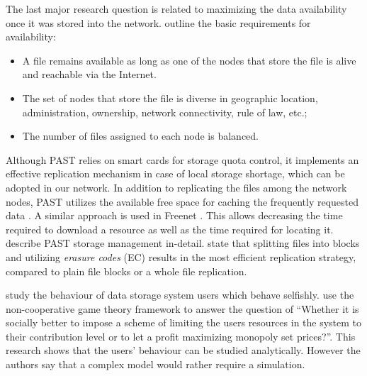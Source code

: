 The last major research question is related to maximizing the data
availability once it was stored into the network.
\citet{past} outline the basic requirements for availability:

\begin{itemize}
\item A file remains available as long as one of the nodes that
      store the file is alive and reachable via the Internet.
\item The set of nodes that store the file is diverse in geographic
      location, administration, ownership, network connectivity, rule
      of law, etc.;
\item The number of files assigned to each node is balanced.
\end{itemize}

Although PAST relies on smart cards for storage quota control, it
implements an effective replication mechanism in case of local
storage shortage, which can be adopted in our network. In addition
to replicating the files among the network nodes, PAST utilizes the
available free space for caching the frequently requested data
\citep{past-caching}. A similar approach is used in Freenet
\citep{freenet}. This allows decreasing the time required to download
a resource as well as the time required for locating it.
\citet{past-caching} describe PAST storage management in-detail.
\citet{p2p-replication-strategy} state that splitting files into
blocks and utilizing \emph{erasure codes} (EC) results in the
most efficient replication strategy, compared to plain file blocks
or a whole file replication.

\citet{selfish-p2p} study the behaviour of \pp data storage system
users which behave selfishly. \citet{selfish-p2p} use the non-cooperative
game theory framework to answer the question of
``Whether it is socially better to
impose a scheme of limiting the users resources in the system
to their contribution level or to let a profit maximizing
monopoly set prices?''. This research shows that the users' behaviour
can be studied analytically. However the authors say that a complex
model would rather require a simulation.


